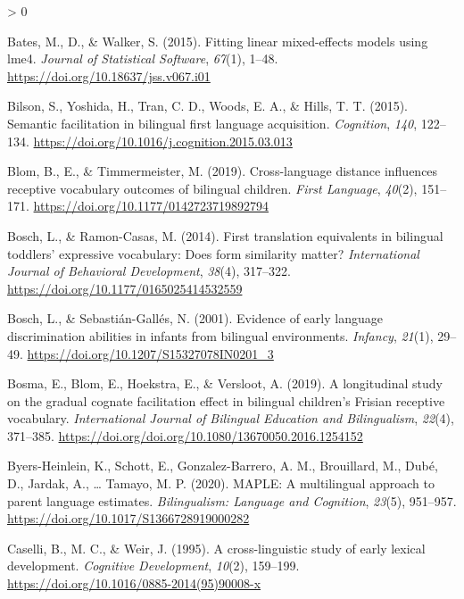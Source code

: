 \documentclass[
  english,
  ,man,floatsintext]{apa6}
\newlength{\cslhangindent}
\newenvironment{CSLReferences}[2] %
 {%
  \setlength{\parindent}{0pt}
  \ifodd #1 \everypar{\setlength{\hangindent}{\cslhangindent}}\ignorespaces\fi
  \ifnum #2 > 0
  \setlength{\parskip}{#2\baselineskip}
  \fi
 }%
 {}
\begin{document}
\hypertarget{refs}{}
\begin{CSLReferences}{1}{0}
\leavevmode\hypertarget{ref-Bates_etal_2015}{}%
Bates, M., D., \& Walker, S. (2015). Fitting linear mixed-effects models using lme4. \emph{Journal of Statistical Software}, \emph{67}(1), 1--48. \url{https://doi.org/10.18637/jss.v067.i01}

\leavevmode\hypertarget{ref-Bilson_etal_2015}{}%
Bilson, S., Yoshida, H., Tran, C. D., Woods, E. A., \& Hills, T. T. (2015). Semantic facilitation in bilingual first language acquisition. \emph{Cognition}, \emph{140}, 122--134. \url{https://doi.org/10.1016/j.cognition.2015.03.013}

\leavevmode\hypertarget{ref-Blom_etal_2019}{}%
Blom, B., E., \& Timmermeister, M. (2019). Cross-language distance influences receptive vocabulary outcomes of bilingual children. \emph{First Language}, \emph{40}(2), 151--171. \url{https://doi.org/10.1177/0142723719892794}

\leavevmode\hypertarget{ref-Bosch_Ramon-Casas_2014}{}%
Bosch, L., \& Ramon-Casas, M. (2014). First translation equivalents in bilingual toddlers' expressive vocabulary: Does form similarity matter? \emph{International Journal of Behavioral Development}, \emph{38}(4), 317--322. \url{https://doi.org/10.1177/0165025414532559}

\leavevmode\hypertarget{ref-Bosch_Sebastian-Galles_2001}{}%
Bosch, L., \& Sebastián-Gallés, N. (2001). Evidence of early language discrimination abilities in infants from bilingual environments. \emph{Infancy}, \emph{21}(1), 29--49. \url{https://doi.org/10.1207/S15327078IN0201_3}

\leavevmode\hypertarget{ref-Bosma_etal_2019}{}%
Bosma, E., Blom, E., Hoekstra, E., \& Versloot, A. (2019). A longitudinal study on the gradual cognate facilitation effect in bilingual children's {F}risian receptive vocabulary. \emph{International Journal of Bilingual Education and Bilingualism}, \emph{22}(4), 371--385. \url{https://doi.org/doi.org/10.1080/13670050.2016.1254152}

\leavevmode\hypertarget{ref-Byers-Heinlein_etal_2020}{}%
Byers-Heinlein, K., Schott, E., Gonzalez-Barrero, A. M., Brouillard, M., Dubé, D., Jardak, A., \ldots{} Tamayo, M. P. (2020). MAPLE: A multilingual approach to parent language estimates. \emph{Bilingualism: Language and Cognition}, \emph{23}(5), 951--957. \url{https://doi.org/10.1017/S1366728919000282}

\leavevmode\hypertarget{ref-Caselli_etal_1995}{}%
Caselli, B., M. C., \& Weir, J. (1995). A cross-linguistic study of early lexical development. \emph{Cognitive Development}, \emph{10}(2), 159--199. \url{https://doi.org/10.1016/0885-2014(95)90008-x}


\end{CSLReferences}
\end{document}
